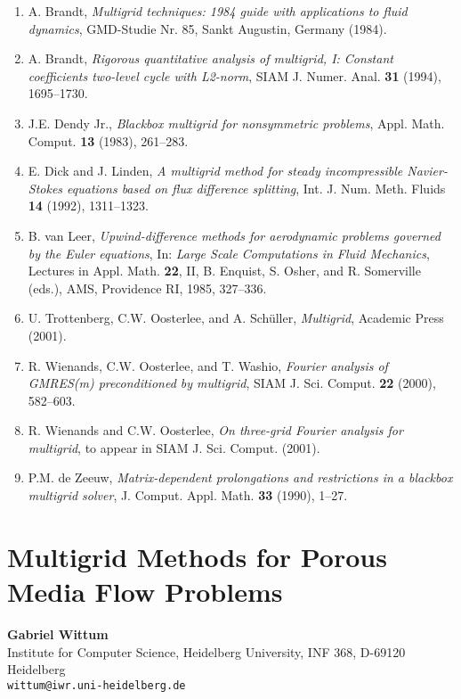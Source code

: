 \documentclass[11pt]{article}
\newcommand{\nextab}[4]{
	\section{#2}
	{\bf #1} \\ \nopagebreak
	{#3} \\ \nopagebreak
	{\tt #4} \nopagebreak
	}
\begin{document}
\begin{enumerate}

\item A. Brandt,
{\em Multigrid techniques: 1984 guide with applications to
fluid dynamics}, GMD-Studie Nr. 85, Sankt Augustin, Germany (1984).

\item A. Brandt,
{\em Rigorous quantitative analysis of multigrid,
I: Constant coefficients two-level cycle with L2-norm},
SIAM J. Numer. Anal. {\bf 31} (1994), 1695--1730.

\item J.E. Dendy Jr.,
{\em Blackbox multigrid for nonsymmetric problems},
Appl. Math. Comput. {\bf 13} (1983), 261--283.

\item E. Dick and J. Linden,
{\em A multigrid method for steady incompressible
Navier-Stokes equations based on flux difference splitting},
Int. J. Num. Meth. Fluids {\bf 14} (1992), 1311--1323.

\item B. van Leer,
{\em Upwind-difference methods for aerodynamic problems
governed by the Euler equations}, In:
{\em Large Scale Computations in Fluid Mechanics},
Lectures in Appl. Math. {\bf 22}, II, B. Enquist, S. Osher,
and R. Somerville (eds.), AMS, Providence RI, 1985, 327--336.

\item U. Trottenberg, C.W. Oosterlee, and A. Sch\"uller,
{\em Multigrid}, Academic Press (2001).

\item R. Wienands, C.W. Oosterlee, and T. Washio,
{\em Fourier analysis of GMRES(m) preconditioned by multigrid},
SIAM J. Sci. Comput. {\bf 22} (2000), 582--603.

\item R. Wienands and C.W. Oosterlee,
{\em On three-grid Fourier analysis for multigrid},
to appear in SIAM J. Sci. Comput. (2001).

\item P.M. de Zeeuw,
{\em Matrix-dependent prolongations and restrictions in a
blackbox multigrid solver},
J. Comput. Appl. Math. {\bf 33} (1990), 1--27.

\end{enumerate}



\nextab
{Gabriel Wittum}
{Multigrid Methods for Porous Media Flow Problems}
{Institute for Computer Science, Heidelberg University, INF 368, D-69120 Heidelberg}
{wittum@iwr.uni-heidelberg.de}
\end{document}
